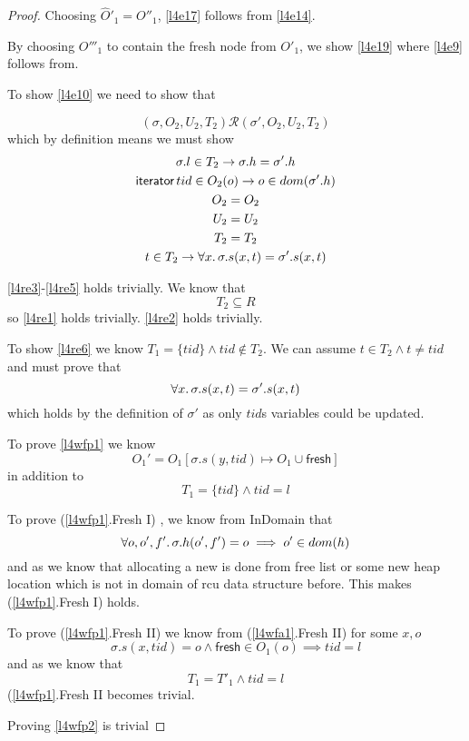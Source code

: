\begin{proof}
Choosing $\hat{O}'_{1} = O''_{1}$, \ref{l4e17} follows from \ref{l4e14}.

By choosing $O'''_{1}$ to contain the fresh node from ${O}'_{1}$, we show \ref{l4e19} where \ref{l4e9} follows from.

To show \ref{l4e10} we need to show that 

\[
(\sigma, O_{2}, U_{2}, T_{2}) \mathcal{R} (\sigma', O_{2}, U_{2}, T_{2})
\]
which by definition means we must show
\begin{gather}
\label{l4re1}
\sigma.l \in T_{2} \rightarrow \sigma.h = \sigma'.h
\\
\label{l4re2}
\textsf{iterator} \, tid \in O_{2}(o) \rightarrow  o \in dom(\sigma'.h)
\\
\label{l4re3}
O_{2} = O_{2}
\\
\label{l4re4}
U_{2} = U_{2}
\\
\label{l4re5}
T_{2} = T_{2}
\\
\label{l4re6}
t \in T_{2} \rightarrow \forall x \ldotp \sigma.s(x,t) = \sigma'.s(x,t)
\end{gather}

\ref{l4re3}-\ref{l4re5} holds trivially. We know that 
\[T_{2} \subseteq R\]
so \ref{l4re1} holds trivially. \ref{l4re2} holds trivially.

To show \ref{l4re6} we know $T_{1} = \{tid\} \land tid \notin T_{2}$.  We can assume $t \in T_{2} \land t \ne tid$ and must prove that 
\[
\forall x \ldotp \sigma.s(x,t) = \sigma'.s(x,t) 
\]
which holds by the definition of $\sigma'$ as only $tid$s variables could be updated. 

To prove \ref{l4wfp1} we know 
\[O_{1}' = O_{1}[\sigma.s(y,tid) \mapsto O_{1} \cup \mathsf{fresh} ] \]
in addition to
\[T_{1}=\{tid\} \land tid= l\]

To prove (\ref{l4wfp1}.\textsf{Fresh I}) , we know from \textsf{InDomain} that
 \[\forall o,o',f' \ldotp \sigma.h(o',f') = o \implies o' \in dom(h) \] and
as we know that allocating a new is done from free list or some new heap location which is not in domain of rcu data structure before.  This makes (\ref{l4wfp1}.\textsf{Fresh I}) holds.

To prove (\ref{l4wfp1}.\textsf{Fresh II}) we know from (\ref{l4wfa1}.\textsf{Fresh II}) for some $x,o$ 
\[ \sigma.s(x,tid) = o \land \mathsf{fresh} \in O_{1}(o) \implies tid = l \]
and as we know that 
\[ T_{1} = T'_{1} \land tid = l \]
(\ref{l4wfp1}.\textsf{Fresh II} becomes trivial.

Proving \ref{l4wfp2} is trivial
\end{proof}

